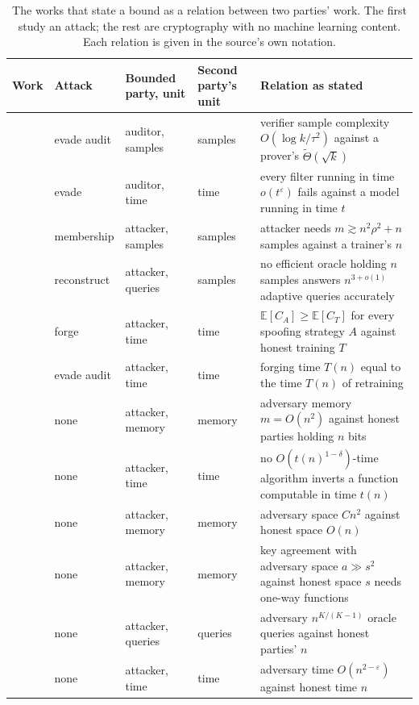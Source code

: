 \begin{table}[t]
\centering
\small
\caption{The \NumRelative{} works that state a bound as a relation between two parties' work. The first \NumRelativeAttack{} study an attack; the rest are cryptography with no machine learning content. Each relation is given in the source's own notation.}
\label{tab:relative}
\begin{tabular}{@{}lllp{2.2cm}p{7.4cm}@{}}
\toprule
Work & Attack & Bounded party, unit & Second party's unit & Relation as stated \\
\midrule
\cite{NK26} & evade audit & auditor, samples & samples & verifier sample complexity $O(\log k/\tau^2)$ against a prover's $\tilde\Theta(\sqrt{k})$ \\
\cite{BGGKRR26} & evade & auditor, time & time & every filter running in time $o(t^{\varepsilon})$ fails against a model running in time $t$ \\
\cite{HSU25} & membership & attacker, samples & samples & attacker needs $m \gtrsim n^2\rho^2 + n$ samples against a trainer's $n$ \\
\cite{HU14} & reconstruct & attacker, queries & samples & no efficient oracle holding $n$ samples answers $n^{3+o(1)}$ adaptive queries accurately \\
\cite{JYCDTCP21} & forge & attacker, time & time & $\mathbb{E}[C_A] \geq \mathbb{E}[C_T]$ for every spoofing strategy $A$ against honest training $T$ \\
\cite{ZCSL24} & evade audit & attacker, time & time & forging time $T(n)$ equal to the time $T(n)$ of retraining \\
\midrule
\cite{DQW22} & none & attacker, memory & memory & adversary memory $m = O(n^2)$ against honest parties holding $n$ bits \\
\cite{BRSV17} & none & attacker, time & time & no $O(t(n)^{1-\delta})$-time algorithm inverts a function computable in time $t(n)$ \\
\cite{GZ19} & none & attacker, memory & memory & adversary space $Cn^2$ against honest space $O(n)$ \\
\cite{BCEQ24} & none & attacker, memory & memory & key agreement with adversary space $a \gg s^2$ against honest space $s$ needs one-way functions \\
\cite{ACMS23} & none & attacker, queries & queries & adversary $n^{K/(K-1)}$ oracle queries against honest parties' $n$ \\
\cite{BCS24} & none & attacker, time & time & adversary time $O(n^{2-\varepsilon})$ against honest time $n$ \\

\end{tabular}
\end{table}
